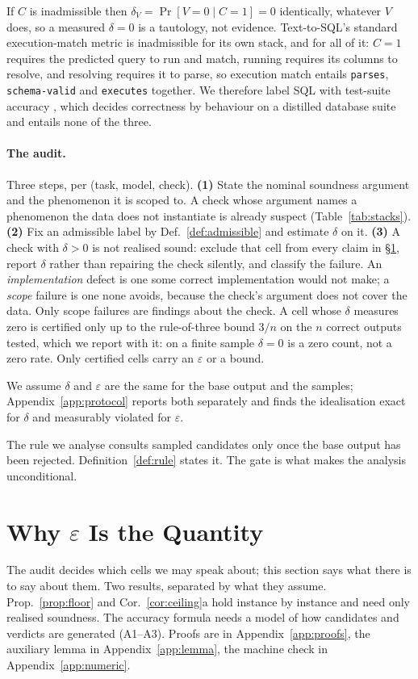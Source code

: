 \documentclass[11pt]{article}
\begin{document}
If $C$ is inadmissible then $\delta_V=\Pr[V{=}0\mid C{=}1]=0$ identically,
whatever $V$ does, so a measured $\delta=0$ is a tautology,
not evidence.
Text-to-SQL's standard execution-match metric is inadmissible for its own stack,
and for all of it: $C{=}1$ requires the predicted query to run and match, running
requires its columns to resolve, and resolving requires it to parse, so
execution match entails \texttt{parses}, \texttt{schema-valid} and
\texttt{executes} together. We therefore label SQL with test-suite accuracy
\citep{zhong2020testsuite}, which decides correctness by behaviour on a
distilled database suite and entails none of the three.

\paragraph{The audit.} Three steps, per (task, model, check).
\textbf{(1)} State the nominal soundness argument and the phenomenon it is
scoped to. A check whose argument names a phenomenon the data does not
instantiate is already suspect (Table~\ref{tab:stacks}).
\textbf{(2)} Fix an admissible label by Def.~\ref{def:admissible} and estimate
$\delta$ on it.
\textbf{(3)} A check with $\delta>0$ is not realised sound: exclude that cell
from every claim in \S\ref{sec:theory}, report $\delta$ rather than repairing
the check silently, and classify the failure. An \emph{implementation} defect is one some correct implementation would not
make; a \emph{scope} failure is one none avoids, because the check's argument
does not cover the data. Only scope failures are findings about the check. A cell whose $\delta$ measures zero is certified only up to the rule-of-three
bound $3/n$ on the $n$ correct outputs tested, which we report with it: on a
finite sample $\delta=0$ is a zero count, not a zero rate. Only certified cells
carry an $\varepsilon$ or a bound.

We assume $\delta$ and $\varepsilon$ are the same for the base output and the
samples; Appendix~\ref{app:protocol} reports both separately and finds the
idealisation exact for $\delta$ and measurably violated for $\varepsilon$.

The rule we analyse consults sampled candidates only once the base output has
been rejected. Definition~\ref{def:rule} states it. The gate is what makes the
analysis unconditional.
\section{Why $\varepsilon$ Is the Quantity}\label{sec:theory}
The audit decides which cells we may speak about; this section says what there
is to say about them. Two results, separated by what they assume. Prop.~\ref{prop:floor} and
Cor.~\ref{cor:ceiling}a hold instance by instance and need only realised
soundness. The accuracy formula needs a model of how candidates and verdicts are
generated (A1--A3). Proofs are in Appendix~\ref{app:proofs}, the auxiliary lemma in
Appendix~\ref{app:lemma}, the machine check in Appendix~\ref{app:numeric}.
\end{document}
